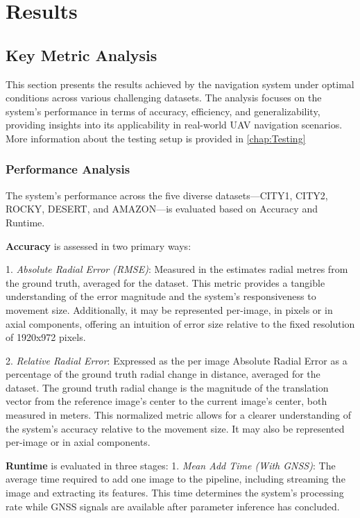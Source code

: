 
\chapter{Results}

\vspace{-1cm}

\section{Key Metric Analysis}

This section presents the results achieved by the navigation system under optimal conditions across various challenging datasets. The analysis focuses on the system's performance in terms of accuracy, efficiency, and generalizability, providing insights into its applicability in real-world UAV navigation scenarios. More information about the testing setup is provided in \ref{chap:Testing}




\subsection{Performance Analysis}

The system's performance across the five diverse datasets—CITY1, CITY2, ROCKY, DESERT, and AMAZON—is evaluated based on Accuracy and Runtime.

\textbf{Accuracy} is assessed in two primary ways:

1. \textit{Absolute Radial Error (RMSE)}: Measured in the estimates radial metres from the ground truth, averaged for the dataset. This metric provides a tangible understanding of the error magnitude and the system's responsiveness to movement size. Additionally, it may be represented per-image, in pixels or in axial components, offering an intuition of error size relative to the fixed resolution of 1920x972 pixels.

2. \textit{Relative Radial Error}: Expressed as the per image Absolute Radial Error as a percentage of the ground truth radial change in distance, averaged for the dataset. The ground truth radial change is the magnitude of the translation vector from the reference image's center to the current image's center, both measured in meters. This normalized metric allows for a clearer understanding of the system's accuracy relative to the movement size. It may also be represented per-image or in axial components.


\textbf{Runtime} is evaluated in three stages:
1. \textit{Mean Add Time (With GNSS)}: The average time required to add one image to the pipeline, including streaming the image and extracting its features. This time determines the system's processing rate while GNSS signals are available after parameter inference has concluded.

